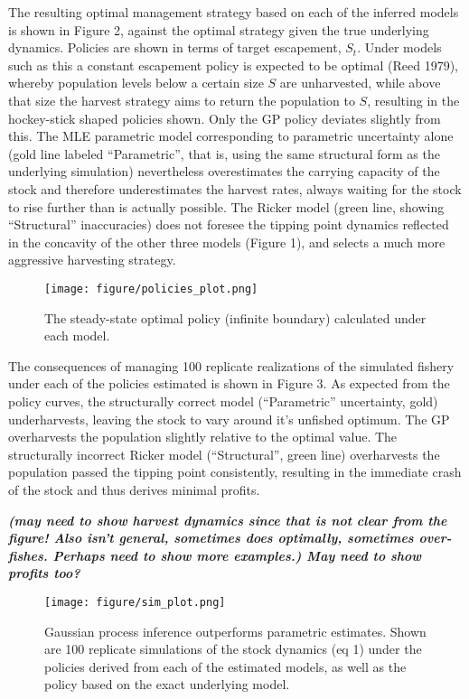 \documentclass[author-year, review]{elsarticle} %
\makeatletter
\def\maxwidth{\ifdim\Gin@nat@width>\linewidth\linewidth
\else\Gin@nat@width\fi}
\let\Oldincludegraphics\includegraphics
\renewcommand{\includegraphics}[1]{\Oldincludegraphics[width=\maxwidth]{#1}}
\makeatother
\begin{document}
The resulting optimal management strategy based on each of the inferred
models is shown in Figure 2, against the optimal strategy given the true
underlying dynamics. Policies are shown in terms of target escapement,
$S_t$. Under models such as this a constant escapement policy is
expected to be optimal (Reed 1979), whereby population levels below a
certain size $S$ are unharvested, while above that size the harvest
strategy aims to return the population to $S$, resulting in the
hockey-stick shaped policies shown. Only the GP policy deviates slightly
from this. The MLE parametric model corresponding to parametric
uncertainty alone (gold line labeled ``Parametric'', that is, using the
same structural form as the underlying simulation) nevertheless
overestimates the carrying capacity of the stock and therefore
underestimates the harvest rates, always waiting for the stock to rise
further than is actually possible. The Ricker model (green line, showing
``Structural'' inaccuracies) does not foresee the tipping point dynamics
reflected in the concavity of the other three models (Figure 1), and
selects a much more aggressive harvesting strategy.

\begin{figure}[htbp]
\centering
\texttt{[image: figure/policies\_plot.png]}
\caption{The steady-state optimal policy (infinite boundary) calculated
under each model.}
\end{figure}

The consequences of managing 100 replicate realizations of the simulated
fishery under each of the policies estimated is shown in Figure 3. As
expected from the policy curves, the structurally correct model
(``Parametric'' uncertainty, gold) underharvests, leaving the stock to
vary around it's unfished optimum. The GP overharvests the population
slightly relative to the optimal value. The structurally incorrect
Ricker model (``Structural'', green line) overharvests the population
passed the tipping point consistently, resulting in the immediate crash
of the stock and thus derives minimal profits.

\textbf{\emph{(may need to show harvest dynamics since that is not clear
from the figure! Also isn't general, sometimes does optimally, sometimes
over-fishes. Perhaps need to show more examples.) May need to show
profits too?}}

\begin{figure}[htbp]
\centering
\texttt{[image: figure/sim\_plot.png]}
\caption{Gaussian process inference outperforms parametric estimates.
Shown are 100 replicate simulations of the stock dynamics (eq 1) under
the policies derived from each of the estimated models, as well as the
policy based on the exact underlying model.}
\end{figure}
\end{document}
